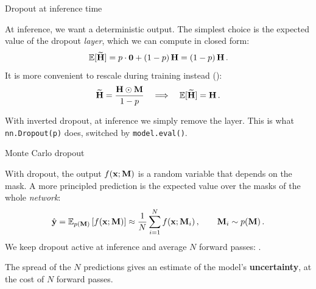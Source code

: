 \documentclass[11pt,aspectratio=169]{beamer}
\begin{document}
\begin{frame}{Dropout at inference time}
    \setlength{\parskip}{6pt}

    At inference, we want a deterministic output. The simplest choice is the
    expected value of the dropout \textit{layer}, which we can compute in
    closed form:
    \[
        \mathbb{E}[\widetilde{\boldsymbol{\mathbf{H}}}] = p \cdot \boldsymbol{\mathbf{0}} + (1-p)\,\boldsymbol{\mathbf{H}} = (1-p)\,\boldsymbol{\mathbf{H}} \,.
    \]
    It is more convenient to rescale during training instead
    ():
    \[
        \widetilde{\boldsymbol{\mathbf{H}}} = \frac{\boldsymbol{\mathbf{H}} \odot \boldsymbol{\mathbf{M}}}{1-p}
        \quad\Longrightarrow\quad
        \mathbb{E}[\widetilde{\boldsymbol{\mathbf{H}}}] = \boldsymbol{\mathbf{H}} \,.
    \]

    \begin{tcolorbox}[nndsgreen]
        With inverted dropout, at inference we simply remove the layer. This is
        what \texttt{nn.Dropout(p)} does, switched by \texttt{model.eval()}.
    \end{tcolorbox}

\end{frame}

\begin{frame}{Monte Carlo dropout}
    \setlength{\parskip}{6pt}

    With dropout, the output $f(\boldsymbol{\mathbf{x}}; \boldsymbol{\mathbf{M}})$ is a random variable that
    depends on the mask. A more principled prediction is the expected value
    over the masks of the whole \textit{network}:
    \[
        \hat{\boldsymbol{\mathbf{y}}} = \mathbb{E}_{p(\boldsymbol{\mathbf{M}})}\left[f(\boldsymbol{\mathbf{x}}; \boldsymbol{\mathbf{M}})\right]
        \approx \frac{1}{N} \sum_{i=1}^N f(\boldsymbol{\mathbf{x}}; \boldsymbol{\mathbf{M}}_i) \,, \qquad \boldsymbol{\mathbf{M}}_i \sim p(\boldsymbol{\mathbf{M}}) \,.
    \]
    We keep dropout active at inference and average $N$ forward passes:
    .

    \begin{tcolorbox}[nndsgreen]
        The spread of the $N$ predictions gives an estimate of the model's
        \textbf{uncertainty}, at the cost of $N$ forward passes.
    \end{tcolorbox}


\end{frame}
\end{document}
